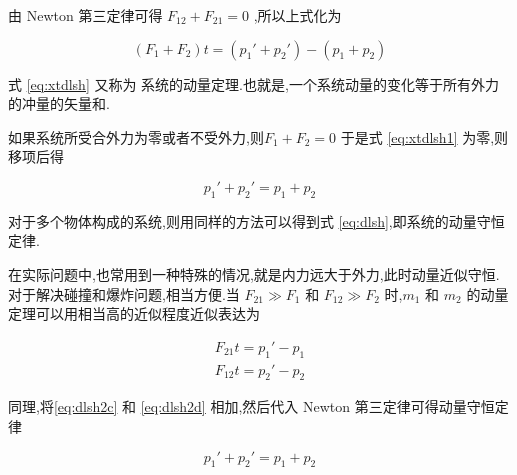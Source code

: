 由 Newton 第三定律可得 $F_{12}+F_{21}=0$ ,所以上式化为

\begin{equation}
  (F_1+F_2)t=(p_1'+p_2')-(p_1+p_2)
  \label{eq:xtdlsh1}
\end{equation}

式 \eqref{eq:xtdlsh} 又称为 系统的动量定理.也就是,一个系统动量的变化等于所有外力的冲量的矢量和.

如果系统所受合外力为零或者不受外力,则$F_1+F_2=0$ 于是式 \eqref{eq:xtdlsh1} 为零,则移项后得

\begin{equation}
  p_1'+p_2'=p_1+p_2
  \label{eq:xtdlsh2}
\end{equation}

对于多个物体构成的系统,则用同样的方法可以得到式 \eqref{eq:dlsh},即系统的动量守恒定律.

在实际问题中,也常用到一种特殊的情况,就是内力远大于外力,此时动量近似守恒.对于解决碰撞和爆炸问题,相当方便.当 $F_{21}\gg F_1$ 和 $F_{12}\gg F_2$ 时,$m_1$ 和 $m_2$ 的动量定理可以用相当高的近似程度近似表达为

\begin{gather}
  F_{21}t=p_1'-p_1 \label{eq:dlsh2c}\\
  F_{12}t=p_2'-p_2 \label{eq:dlsh2d}
\end{gather}

同理,将\eqref{eq:dlsh2c} 和 \eqref{eq:dlsh2d} 相加,然后代入 Newton 第三定律可得动量守恒定律

\begin{equation*}
  p_1'+p_2'=p_1+p_2
\end{equation*}
